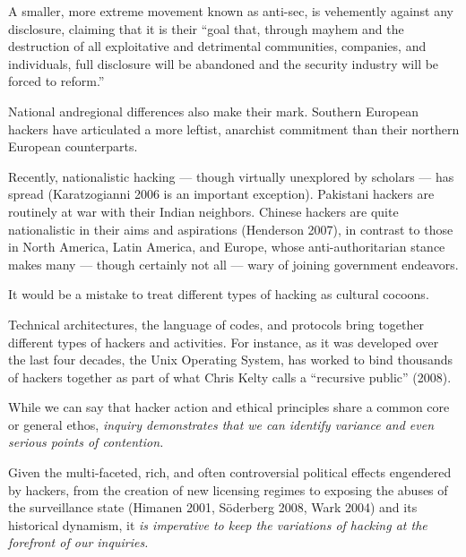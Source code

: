 \documentclass[letterpaper,12pt,english]{sphinxmanual}
\begin{document}
A smaller, more extreme movement known as anti-sec, is vehemently against any disclosure, claiming that it is their “goal that, through mayhem and the destruction of all exploitative and detrimental communities, companies, and individuals, full disclosure will be abandoned and the security industry will be forced to reform.”

National andregional
differences
also make their mark.
Southern
European
hackers
have
articulated
a
more
leftist,
anarchist
commitment
than
their
northern
European
counterparts.

Recently,
nationalistic
hacking — though
virtually unexplored by
scholars — has
spread (Karatzogianni
2006
is
an
important
exception).
Pakistani
hackers
are
routinely
at
war
with
their
Indian
neighbors.
Chinese
hackers
are
quite
nationalistic
in
their
aims
and
aspirations
(Henderson
2007),
in
contrast
to
those
in
North
America,
Latin
America,
and
Europe,
whose
anti-authoritarian
stance
makes
many — though
certainly not
all — wary
of joining
government
endeavors.

It
would
be
a
mistake
to
treat
different types of hacking
as
cultural
cocoons.

Technical architectures, the language of codes, and protocols bring together different types of hackers and activities. For instance, as it was developed over the last four decades, the Unix Operating System, has worked to bind thousands of hackers together as part of what Chris Kelty calls a “recursive public” (2008).

While
we
can
say
that
hacker
action
and
ethical
principles
share
a
common
core or
general
ethos,
\emph{inquiry demonstrates that we can identify variance and even serious points of contention.}

Given
the
multi-faceted,
rich,
and
often
controversial
political
effects
engendered
by
hackers,
from
the
creation
of
new
licensing
regimes
to
exposing
the
abuses
of
the
surveillance
state
(Himanen
2001,
Söderberg
2008, Wark
2004) and
its historical dynamism,
it \emph{is imperative to keep the variations of hacking at the forefront of our inquiries.}
\end{document}
